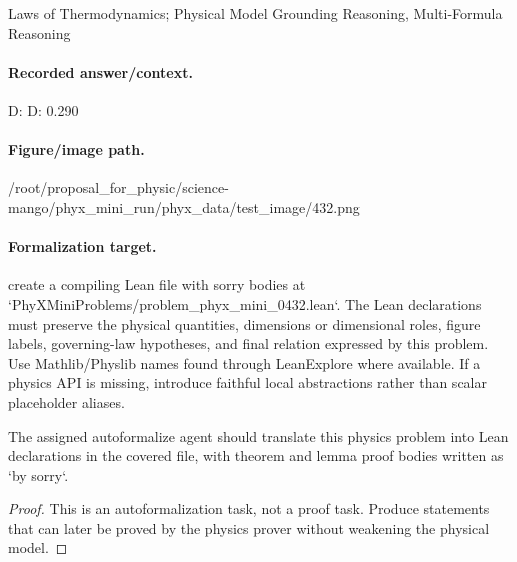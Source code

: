 Laws of Thermodynamics; Physical Model Grounding Reasoning, Multi-Formula Reasoning

\paragraph{Recorded answer/context.}
D: D: 0.290

\paragraph{Figure/image path.}
/root/proposal\_for\_physic/science-mango/phyx\_mini\_run/phyx\_data/test\_image/432.png

\paragraph{Formalization target.}
create a compiling Lean file with sorry bodies at `PhyXMiniProblems/problem\_phyx\_mini\_0432.lean`. The Lean declarations must preserve the physical quantities, dimensions or dimensional roles, figure labels, governing-law hypotheses, and final relation expressed by this problem.
Use Mathlib/Physlib names found through LeanExplore where available. If a physics API is missing, introduce faithful local abstractions rather than scalar placeholder aliases.

\begin{theorem}
\label{thm:physics:phyx_mini_0432:target}
The assigned autoformalize agent should translate this physics problem into Lean declarations in the covered file, with theorem and lemma proof bodies written as `by sorry`.
\end{theorem}
\begin{proof}
This is an autoformalization task, not a proof task. Produce statements that can later be proved by the physics prover without weakening the physical model.
\end{proof}


